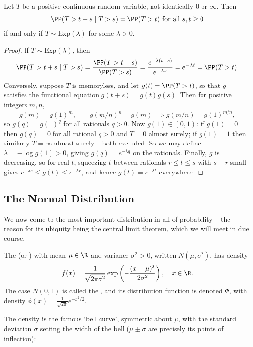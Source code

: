 \begin{theorem}[Memorylessness]
	Let $T$ be a positive continuous random variable, not identically $0$ or $\infty$. Then
	$$
	\PP(T > t + s \mid T > s) = \PP(T > t) \text{ for all } s, t \geq 0
	$$
	if and only if $T \sim \mathrm{Exp}(\lambda)$ for some $\lambda > 0$.
\end{theorem}
\begin{proof}
	If $T \sim \mathrm{Exp}(\lambda)$, then
	$$
	\PP(T > t + s \mid T > s) = \frac{\PP(T > t + s)}{\PP(T > s)} = \frac{e^{-\lambda(t + s)}}{e^{-\lambda s}} = e^{-\lambda t} = \PP(T > t).
	$$
	Conversely, suppose $T$ is memoryless, and let $g(t) = \PP(T > t)$, so that $g$ satisfies the functional equation $g(t + s) = g(t)g(s)$. Then for positive integers $m, n$,
	$$
	g(m) = g(1)^m, \qquad g(m/n)^n = g(m) \implies g(m/n) = g(1)^{m/n},
	$$
	so $g(q) = g(1)^q$ for all rationals $q > 0$. Now $g(1) \in (0, 1)$: if $g(1) = 0$ then $g(q) = 0$ for all rational $q > 0$ and $T = 0$ almost surely; if $g(1) = 1$ then similarly $T = \infty$ almost surely -- both excluded. So we may define $\lambda = -\log g(1) > 0$, giving $g(q) = e^{-\lambda q}$ on the rationals. Finally, $g$ is decreasing, so for real $t$, squeezing $t$ between rationals $r \leq t \leq s$ with $s - r$ small gives $e^{-\lambda s} \leq g(t) \leq e^{-\lambda r}$, and hence $g(t) = e^{-\lambda t}$ everywhere.
\end{proof}

\subsection{The Normal Distribution}

We now come to the most important distribution in all of probability -- the reason for its ubiquity being the central limit theorem, which we will meet in due course.

\begin{definition}
	The  (or )  with mean $\mu \in \R$ and variance $\sigma^2 > 0$, written $N(\mu, \sigma^2)$, has density
	$$
	f(x) = \frac{1}{\sqrt{2\pi \sigma^2}} \exp\left(-\frac{(x - \mu)^2}{2\sigma^2}\right), \quad x \in \R.
	$$
	The case $N(0, 1)$ is called the , and its distribution function is denoted $\Phi$, with density $\phi(x) = \frac{1}{\sqrt{2\pi}}e^{-x^2/2}$.
\end{definition}

The density is the famous `bell curve', symmetric about $\mu$, with the standard deviation $\sigma$ setting the width of the bell ($\mu \pm \sigma$ are precisely its points of inflection):

